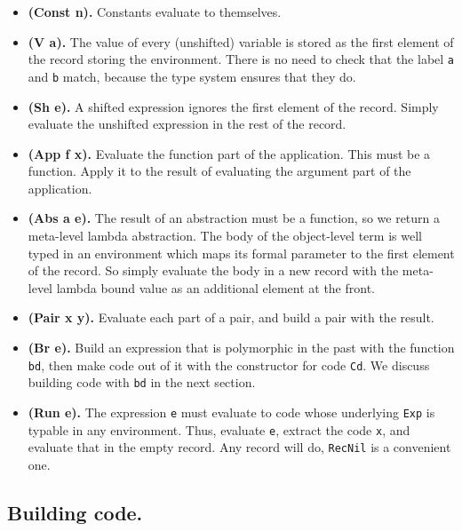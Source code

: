 \documentclass{sigplanconf}
\begin{document}
\begin{itemize}
\item{\bf {\small (Const n)}.} Constants evaluate to themselves.

\item{\bf {\small (V a)}.} The value of every (unshifted) variable is stored as the
first element of the record storing the environment.  There is no need to check
that the label {\tt a} and {\tt b} match, because the type system ensures that they do.

\item{\bf {\small (Sh e)}.} A shifted expression ignores the first element of the
record. Simply evaluate the unshifted expression in the rest of the record.

\item{\bf {\small (App f x)}.} Evaluate the function part of the application. This must be a function. Apply
it to the result of evaluating the argument part of the application.

\item{\bf {\small (Abs a e)}.} The result of an abstraction must be a
function, so we return a meta-level lambda abstraction. The body of the
object-level term is well typed in an environment which maps its formal
parameter to the first element of the record. So simply evaluate the body in a
new record with the meta-level lambda bound value as an additional element at the front.

\item{\bf {\small (Pair x y)}.} Evaluate each part of a pair, and build a pair
with the result.

\item{\bf {\small (Br e)}.} Build an expression that is polymorphic in the
past with the function {\tt bd}, then make code out of it with the
constructor for code {\tt Cd}. We discuss building code with {\tt bd} in the
next section.

\item{\bf {\small (Run e)}.} The expression {\tt e} must evaluate
to code whose underlying {\tt Exp} is typable in any environment.
Thus, evaluate {\tt e}, extract the code {\tt x}, and evaluate that 
in the empty record. Any record will do, {\tt RecNil} is a convenient one.
\end{itemize}

\subsection{Building code.} 
\end{document}
